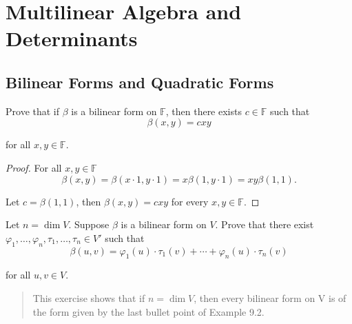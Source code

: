\chapter{Multilinear Algebra and Determinants}

\section{Bilinear Forms and Quadratic Forms}

\begin{exercise}\label{chapter9:sectionA:exercise1}
    Prove that if $\beta$ is a bilinear form on $\mathbb{F}$, then there exists $c\in\mathbb{F}$ such that
    \[
        \beta(x, y) = cxy
    \]

    for all $x, y\in\mathbb{F}$.
\end{exercise}

\begin{proof}
    For all $x, y\in\mathbb{F}$
    \[
        \beta(x, y) = \beta(x\cdot 1, y\cdot 1) = x\beta(1, y\cdot 1) = xy\beta(1,1).
    \]

    Let $c = \beta(1, 1)$, then $\beta(x, y) = cxy$ for every $x, y\in\mathbb{F}$.
\end{proof}
\newpage

\begin{exercise}\label{chapter9:sectionA:exercise2}
    Let $n = \dim V$. Suppose $\beta$ is a bilinear form on $V$. Prove that there exist $\varphi_{1}, \ldots, \varphi_{n}, \tau_{1}, \ldots, \tau_{n}\in V'$ such that
    \[
        \beta(u, v) = \varphi_{1}(u)\cdot\tau_{1}(v) + \cdots + \varphi_{n}(u)\cdot\tau_{n}(v)
    \]

    for all $u, v\in V$.
\end{exercise}

\begin{quote}
    This exercise shows that if $n = \dim V$, then every bilinear form on V is of
    the form given by the last bullet point of Example 9.2.
\end{quote}


